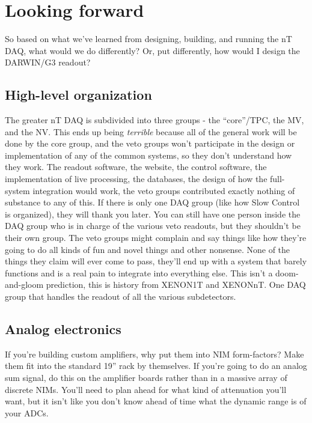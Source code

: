 
\chapter{Looking forward}

So based on what we've learned from designing, building, and running the nT DAQ, what would we do differently?
Or, put differently, how would I design the DARWIN/G3 readout?

\section{High-level organization}

The greater nT DAQ is subdivided into three groups - the ``core''/TPC, the MV, and the NV.
This ends up being \emph{terrible} because all of the general work will be done by the core group, and the veto groups won't participate in the design or implementation of any of the common systems, so they don't understand how they work.
The readout software, the website, the control software, the implementation of live processing, the databases, the design of how the full-system integration would work, the veto groups contributed exactly nothing of substance to any of this.
If there is only one DAQ group (like how Slow Control is organized), they will thank you later.
You can still have one person inside the DAQ group who is in charge of the various veto readouts, but they shouldn't be their own group.
The veto groups might complain and say things like how they're going to do all kinds of fun and novel things and other nonsense.
None of the things they claim will ever come to pass, they'll end up with a system that barely functions and is a real pain to integrate into everything else.
This isn't a doom-and-gloom prediction, this is history from XENON1T and XENONnT.
One DAQ group that handles the readout of all the various subdetectors.

\section{Analog electronics}

If you're building custom amplifiers, why put them into NIM form-factors?
Make them fit into the standard 19'' rack by themselves.
If you're going to do an analog sum signal, do this on the amplifier boards rather than in a massive array of discrete NIMs.
You'll need to plan ahead for what kind of attenuation you'll want, but it isn't like you don't know ahead of time what the dynamic range is of your ADCs.

